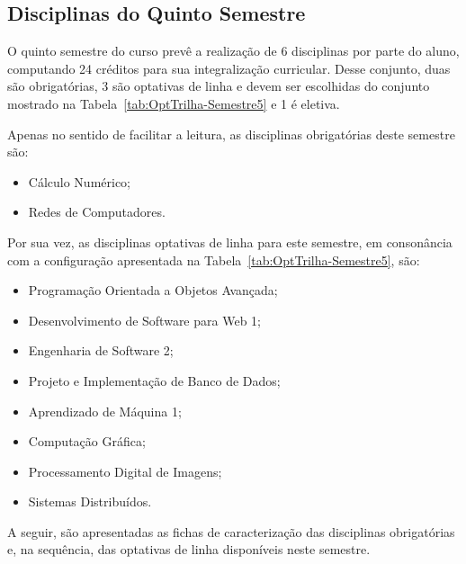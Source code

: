     
    \subsection{Disciplinas do Quinto Semestre}
    
    O quinto semestre do curso prevê a realização de 6 disciplinas por parte do aluno, computando 24 créditos para sua integralização curricular. Desse conjunto, duas são obrigatórias, 3 são optativas de linha e devem ser escolhidas do conjunto mostrado na Tabela~\ref{tab:OptTrilha-Semestre5} e 1 é eletiva. 
    
    Apenas no sentido de facilitar a leitura, as disciplinas obrigatórias deste semestre são: 
    
    \begin{itemize}
        \item Cálculo Numérico;
        \item Redes de Computadores.
    \end{itemize}
    
    Por sua vez, as disciplinas optativas de linha para este semestre, em consonância com a configuração apresentada na Tabela~\ref{tab:OptTrilha-Semestre5}, são:
    
    \begin{itemize}
        \item Programação Orientada a Objetos Avançada;
        \item Desenvolvimento de Software para Web 1;
        \item Engenharia de Software 2;
        \item Projeto e Implementação de Banco de Dados;
        \item Aprendizado de Máquina 1;
        \item Computação Gráfica;
        \item Processamento Digital de Imagens;
        \item Sistemas Distribuídos.
    \end{itemize}
    
    A seguir, são apresentadas as fichas de caracterização das disciplinas obrigatórias e, na sequência, das optativas de linha disponíveis neste semestre.
    
    
    
    
    
    
    
    
    
